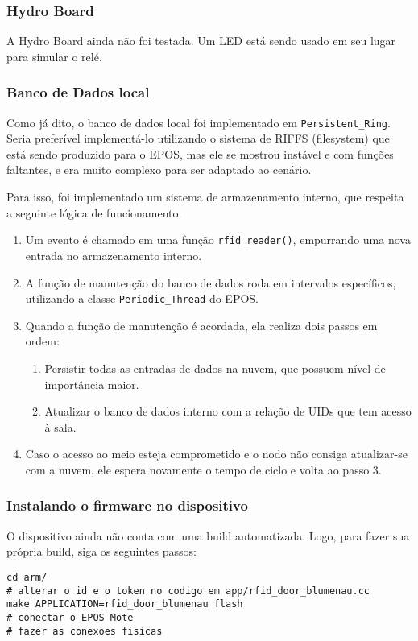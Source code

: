 \documentclass[11pt]{article}
\begin{document}
\subsubsection{Hydro Board}

A Hydro Board ainda não foi testada. Um LED está sendo usado em seu lugar para simular o relé.

\subsubsection{Banco de Dados local}

Como já dito, o banco de dados local foi implementado em \texttt{Persistent\_Ring}. Seria preferível implementá-lo utilizando o sistema de RIFFS (filesystem) que está sendo produzido para o EPOS, mas ele se mostrou instável e com funções faltantes, e era muito complexo para ser adaptado ao cenário.

Para isso, foi implementado um sistema de armazenamento interno, que respeita a seguinte lógica de funcionamento:

\begin{enumerate}
\item Um evento é chamado em uma função \texttt{rfid\_reader()}, empurrando uma nova entrada no armazenamento interno.
\item A função de manutenção do banco de dados roda em intervalos específicos, utilizando a classe \texttt{Periodic\_Thread} do EPOS.
\item Quando a função de manutenção é acordada, ela realiza dois passos em ordem:
\begin{enumerate}
\item Persistir todas as entradas de dados na nuvem, que possuem nível de importância maior.
\item Atualizar o banco de dados interno com a relação de UIDs que tem acesso à sala.
\end{enumerate}
\item Caso o acesso ao meio esteja comprometido e o nodo não consiga atualizar-se com a nuvem, ele espera novamente o tempo de ciclo e volta ao passo 3.
\end{enumerate}

\subsubsection{Instalando o firmware no dispositivo}

O dispositivo ainda não conta com uma build automatizada. Logo, para fazer sua própria build, siga os seguintes passos:

\begin{lstlisting}
cd arm/
# alterar o id e o token no codigo em app/rfid_door_blumenau.cc
make APPLICATION=rfid_door_blumenau flash
# conectar o EPOS Mote
# fazer as conexoes fisicas
\end{lstlisting}
\end{document}
